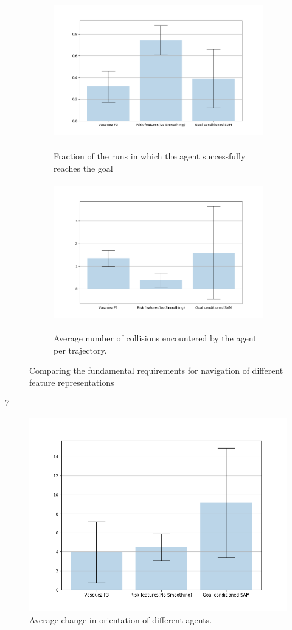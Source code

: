 \begin{figure}[!htbp]
	\begin{subfigure}{.5\textwidth}
		\centering
		\includegraphics[width=\linewidth, height=6cm]{plots/inter_IRL/goal_reached.png}
		\label{fig:inter_IRL-goal_reached}
		\caption{Fraction of the runs in which the agent successfully reaches the goal}
	\end{subfigure}
	\begin{subfigure}{.5\textwidth}
		\centering
		\includegraphics[width=\linewidth, height=6cm]{plots/inter_IRL/count_collisions.png}
		\label{fig:inter_IRL-collision_counts}
		\caption{Average number of collisions encountered by the agent per trajectory.}
	\end{subfigure}
	\caption{Comparing the fundamental requirements for navigation of different feature representations }
\end{figure}7

\begin{figure}[htbp]
	\centering
	\includegraphics[width=0.7\linewidth]{plots/inter_IRL/avg_trajectory_smoothness.png}
	\caption{Average change in orientation of different agents.}
	\label{fig:inter_IRL-change_in_orientation_avg}
\end{figure}


